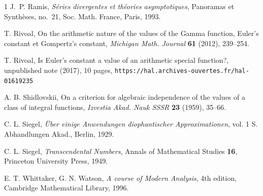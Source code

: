 \begin{thebibliography}{1}
 J.~P. Ramis, {\em S\'eries divergentes et th\'eories
  asymptotiques}, Panoramas et Synth\`eses, no.~21, Soc. Math. France, Paris,
  1993.

 T. Rivoal, { On the arithmetic nature of the values of the Gamma function, Euler's constant et Gompertz's constant}, {\em  Michigan Math. Journal} {\bf 61} (2012),  239--254.

 T. Rivoal,  Is Euler's constant a value of an arithmetic special function?, unpublished note (2017), 10 pages, {\tt https://hal.archives-ouvertes.fr/hal-01619235}

 A. B. Shidlovskii, {On a criterion for algebraic independence of the values of a class of integral functions}, {\em Izvestia Akad. Nauk SSSR} {\bf 23} (1959), 35--66.


 C. L. Siegel, {\em \"Uber einige Anwendungen diophantischer Approximationen}, vol. 1 S. Abhand\-lungen Akad., Berlin, 1929.

 C. L. Siegel, {\em Transcendental Numbers}, Annals of Mathematical Studies {\bf 16}, Princeton University Press, 1949.

 E. T. Whittaker, G. N. Watson, {\em A course of Modern Analysis}, 4th edition, Cambridge Mathematical Library, 1996.

\end{thebibliography}

